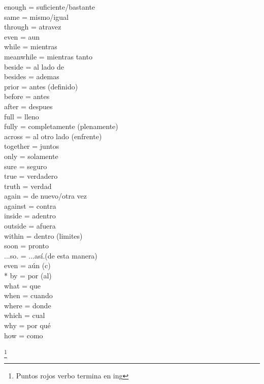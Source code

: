 \documentclass[letterpaper]{article}
\newcommand{\reddot}{\raisebox{0.5pt}{\tikz{\node[draw,scale=0.5,circle,fill=red!20!red](){};}}} %
\newcommand\blfootnote[1]{%
  \begingroup
  \renewcommand\thefootnote{}\footnote{#1}%
  \addtocounter{footnote}{-1}%
  \endgroup
}
\begin{document}
\begin{multicols}{2}
\begin{tabbing}
enough \> = \> suficiente/bastante \\
same \> = \> mismo/igual \\
through \reddot \> = \> atravez \\
even \> = \> aun \\
while \reddot \> = \> mientras \\
meanwhile \> = \> mientras tanto \\
beside \> = \> al lado de \\
besides \reddot \> = \> ademas \\
prior \> = \> antes (definido) \\
before \reddot \> = \> antes \\
after \> = \> despues \\
full \> = \> lleno \\
fully \> = \> completamente (plenamente) \\
across \> = \> al otro lado (enfrente) \\
together \> = \> juntos \\
only \> = \> solamente \\
sure \> = \> seguro \\
true \> = \> verdadero \\
truth \> = \> verdad \\
again \> = \> de nuevo/otra vez \\
against \> = \> contra \\
inside \> = \> adentro \\
outside \> = \> afuera \\
within \> = \> dentro (limites) \\
soon \> = \> pronto \\
...so. \> = \> ...así.(de esta manera) \\
even \> = \> aún (c)\\
\** by \reddot \> = \> por (al)\\
what \> = \> que\\
when \> = \> cuando \\
where \> = \> donde \\
which \> = \> cual \\
why \> = \> por qué \\
how \> = \> como \\







\end{tabbing}
\blfootnote{\reddot \space Puntos rojos verbo termina en ing}
\end{multicols}
\end{document}
